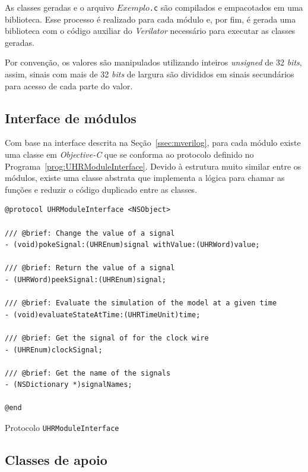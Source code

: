 As classes geradas e o arquivo \texttt{$Exemplo$.c} são compilados e empacotados em uma biblioteca. Esse processo
é realizado para cada módulo e, por fim, é gerada uma biblioteca com o código auxiliar do \emph{Verilator} necessário para executar
as classes geradas.

Por convenção, os valores são manipulados utilizando inteiros \emph{unsigned} de 32 \emph{bits}, assim, sinais com mais de
32 \emph{bits} de largura são divididos em sinais secundários para acesso de cada parte do valor.

\subsection{Interface de módulos}
\label{ssec:imdl}

Com base na interface descrita na Seção~\ref{ssec:mverilog}, para cada módulo existe uma classe em \emph{Objective-C} que se conforma ao protocolo
definido no Programa~\ref{prog:UHRModuleInterface}. Devido à estrutura muito similar entre os módulos, existe uma classe abstrata que implementa
a lógica para chamar as funções e reduzir o código duplicado entre as classes.

\begin{program}
  \centering

\lstset{language=[Objective]C}
\begin{lstlisting}[style=wider]
@protocol UHRModuleInterface <NSObject>

/// @brief: Change the value of a signal
- (void)pokeSignal:(UHREnum)signal withValue:(UHRWord)value;

/// @brief: Return the value of a signal
- (UHRWord)peekSignal:(UHREnum)signal;

/// @brief: Evaluate the simulation of the model at a given time
- (void)evaluateStateAtTime:(UHRTimeUnit)time;

/// @brief: Get the signal of for the clock wire
- (UHREnum)clockSignal;

/// @brief: Get the name of the signals
- (NSDictionary *)signalNames;

@end
\end{lstlisting}

  \caption{Protocolo \texttt{UHRModuleInterface} \label{prog:UHRModuleInterface}}
\end{program}

\subsection{Classes de apoio}
\label{ssec:apoio}

